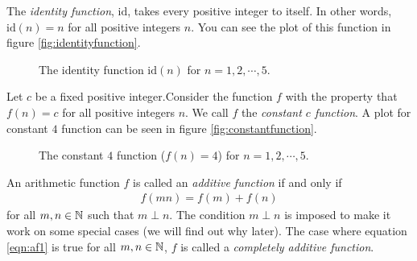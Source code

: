 \documentclass[12pt]{subfile}
\begin{document}
		\begin{definition}
			The \textit{identity function}, $\text{id}$, takes every positive integer to itself. In other words, $\text{id}(n)=n$ for all positive integers $n$. You can see the plot of this function in figure \eqref{fig:identityfunction}. 
			
			\begin{figure}
				\centering
				\caption{The identity function $\text{id}(n)$ for $n=1,2,\cdots,5$.}
				\label{fig:identityfunction}
			\end{figure}
			
		\end{definition}
		
		\begin{definition}
			Let $c$ be a fixed positive integer.Consider the function $f$ with the property that $f(n)=c$ for all positive integers $n$. We call $f$ the \textit{constant $c$ function}. A plot for constant $4$ function can be seen in figure \eqref{fig:constantfunction}.
			
			\begin{figure}
				\centering
				\caption{The constant $4$ function ($f(n)=4$) for $n=1,2,\cdots,5$.}
				\label{fig:constantfunction}
			\end{figure}
		\end{definition}
		\begin{definition}
			An arithmetic function $f$ is called an \textit{additive function} if and only if 
				\begin{align}
					f(mn)=f(m)+f(n)\label{eqn:af1}
				\end{align}
			for all $m,n\in\mathbb{N}$ such that $m\perp n$. The condition $m\perp n$ is imposed to make it work on some special cases (we will find out why later). The case where equation \eqref{eqn:af1} is true for all $m,n\in\mathbb{N}$, $f$ is called a \textit{completely additive function}.
		\end{definition}		
		
\end{document}
